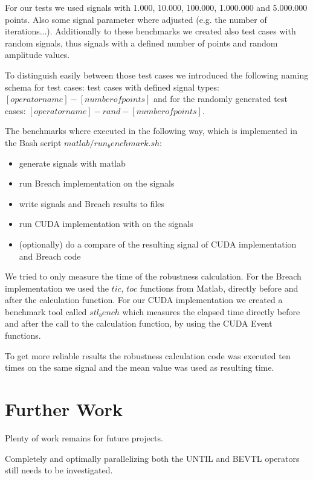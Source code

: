 \documentclass[a4paper,10pt]{article}
\begin{document}
For our tests we used signals with 1.000, 10.000, 100.000, 1.000.000 and 5.000.000 points. Also some signal parameter where adjusted (e.g. the number of iterations...). 
Additionally to these benchmarks we created also test cases with random signals, thus signals with a defined number of points and random amplitude values. 

To distinguish easily between those test cases we introduced the following naming schema for test cases: test cases with defined signal types: $[operator name]-[number of points]$ and for the randomly generated test cases: $[operator name]-rand-[number of points]$.

The benchmarks where executed in the following way, which is implemented in the Bash script $matlab/run_benchmark.sh$:
\begin{itemize}
	\item generate signals with matlab 
	\item run Breach implementation on the signals
	\item write signals and Breach results to files
	\item run CUDA implementation with on the signals
	\item (optionally) do a compare of the resulting signal of CUDA implementation and Breach code
\end{itemize}

We tried to only measure the time of the robustness calculation. For the Breach implementation we used the $tic$, $toc$ functions from Matlab, directly before and after the calculation function. For our CUDA implementation we created a benchmark tool called $stl_bench$ which measures the elapsed time directly before and after the call to the calculation function, by using the CUDA Event functions.

To get more reliable results the robustness calculation code was executed ten times on the same signal and the mean value was used as resulting time.


\section{Further Work}

Plenty of work remains for future projects.

Completely and optimally parallelizing both the UNTIL and BEVTL operators still needs
to be investigated.
\end{document}
